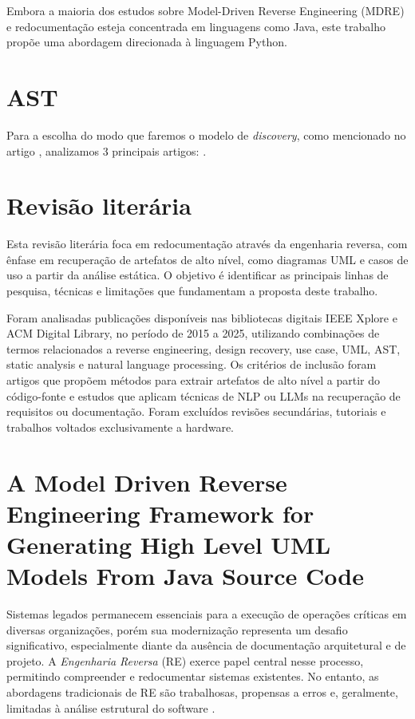 \documentclass[12pt,a4paper]{article}
\begin{document}
Embora a maioria dos estudos sobre Model-Driven Reverse Engineering (MDRE) e redocumentação esteja concentrada em linguagens como Java, este trabalho propõe uma abordagem direcionada à linguagem Python.

\section{AST}
Para a escolha do modo que faremos o modelo de \textit{discovery}, como mencionado no artigo \textcite{Bruneliere2010MoDisco}, analizamos 3 principais artigos: \textcite{feng2020codebert, feng2020codebert, ngo2023exploring}.

\section{Revisão literária}
Esta revisão literária foca em redocumentação através da engenharia reversa, com ênfase em recuperação de artefatos de alto nível, como diagramas UML e casos de uso a partir da análise estática. O objetivo é identificar as principais linhas de pesquisa, técnicas e limitações que fundamentam a proposta deste trabalho.

Foram analisadas publicações disponíveis nas bibliotecas digitais IEEE Xplore e ACM Digital Library, no período de 2015 a 2025, utilizando combinações de termos relacionados a reverse engineering, design recovery, use case, UML, AST, static analysis e natural language processing. Os critérios de inclusão foram artigos que propõem métodos para extrair artefatos de alto nível a partir do código-fonte e estudos que aplicam técnicas de NLP ou LLMs na recuperação de requisitos ou documentação. Foram excluídos revisões secundárias, tutoriais e trabalhos voltados exclusivamente a hardware.

\section{A Model Driven Reverse Engineering Framework for Generating High Level UML Models From Java Source Code}

Sistemas legados permanecem essenciais para a execução de operações críticas em diversas organizações, porém sua modernização representa um desafio significativo, especialmente diante da ausência de documentação arquitetural e de projeto. A \textit{Engenharia Reversa} (RE) exerce papel central nesse processo, permitindo compreender e redocumentar sistemas existentes. No entanto, as abordagens tradicionais de RE são trabalhosas, propensas a erros e, geralmente, limitadas à análise estrutural do software \textcite{Sabir2019MDRE}.
\end{document}

